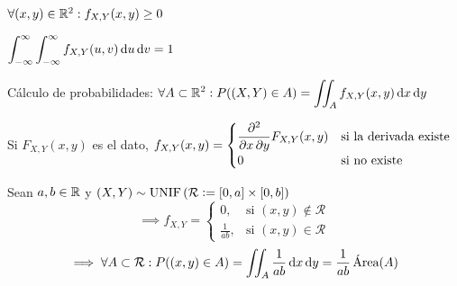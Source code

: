 \begin{obs}
	\begin{itemize*}[itemjoin=\hspace{1cm}]
		\item $\forall (x, y) \in\mathbb{R}^2 : f_{X, Y}(x, y) \geq 0$
		\item $\ds \int_{-\infty}^{\infty} \int_{-\infty}^{\infty} f_{X, Y}(u, v) \odif{u} \odif{v} = 1$
	\end{itemize*}
\end{obs}

Cálculo de probabilidades: $\ds \forall A \subset \R^2 : P((X, Y)\in A) = \iint_{A} f_{X, Y}(x, y) \odif{x} \odif{y}$

Si $F_{X, Y} (x, y)$ es el dato, $\displaystyle f_{X, Y}(x, y) = \begin{cases} \displaystyle \pdv{}{x, y} F_{X, Y}(x, y) &\text{si la derivada existe} \\ 0 &\text{si no existe}\end{cases}$

\begin{ejem}
	Sean $a, b \in \mathbb{R}$ y $(X, Y) \sim \operatorname{UNIF}\left(\mathcal{R} \vcentcolon= [0, a] \times [0, b]\right)$
	\[\implies f_{X, Y} = \begin{cases}
			0,            & \text{si } (x, y) \notin \mathcal{R} \\
			\frac{1}{ab}, & \text{si } (x, y) \in \mathcal{R}
		\end{cases}\]
	\[\implies \forall A \subset \mathcal{R} : P((x, y) \in A) = \iint_{A} \frac{1}{ab} \odif{x} \odif{y} = \frac{1}{ab} \operatorname{\tex{Área}}(A)\]
\end{ejem}



